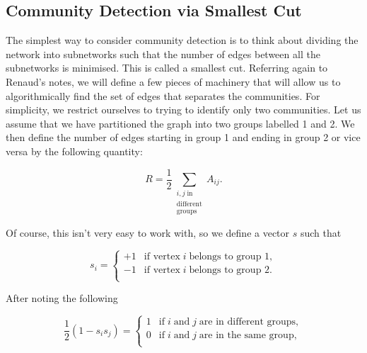 


\subsection{Community Detection via Smallest Cut}\label{sec:smallest_cut}
The simplest way to consider community detection is to think about dividing the network into subnetworks such that the number of edges between all the subnetworks is minimised. This is called a smallest cut. Referring again to Renaud's notes, we will define a few pieces of machinery that will allow us to algorithmically find the set of edges that separates the communities.\cite[26-27]{oxford:renaud_notes} For simplicity, we restrict ourselves to trying to identify only two communities. Let us assume that we have partitioned the graph into two groups labelled 1 and 2. We then define the number of edges starting in group 1 and ending in group 2 or vice versa by the following quantity:

$$ R = \frac{1}{2} \sum_{\substack{i, j \; \text{in} \\ \text{different} \\ \text{groups}}} A_{ij}. $$

Of course, this isn't very easy to work with, so we define a vector $s$ such that

$$ s_i = 
\begin{cases}
    +1 & \text{if vertex} \; i \; \text{belongs to group 1}, \\
    -1 & \text{if vertex} \; i \; \text{belongs to group 2}. \\
\end{cases}
$$

After noting the following

$$ \frac{1}{2}(1 - s_i s_j) = 
\begin{cases}
    1 & \text{if} \; i \; \text{and} \; j \; \text{are in different groups}, \\
    0 & \text{if} \; i \; \text{and} \; j \; \text{are in the same group}, \\
\end{cases}
$$

